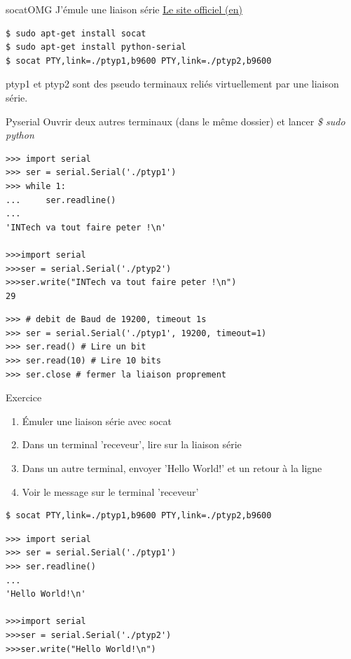 \documentclass{beamer}
\begin{document}
\begin{frame}[fragile]{socat}{OMG J'émule une liaison série}
\underline{\href{http://pyserial.sourceforge.net/}{Le site officiel (en)}}
\begin{lstlisting}[language=bash]
$ sudo apt-get install socat
$ sudo apt-get install python-serial
$ socat PTY,link=./ptyp1,b9600 PTY,link=./ptyp2,b9600
\end{lstlisting}
ptyp1 et ptyp2 sont des pseudo terminaux reliés virtuellement par une liaison série.\\
\end{frame}

\begin{frame}[fragile]{Pyserial}
Ouvrir deux autres terminaux (dans le même dossier) et lancer \textit{\$ sudo python}
\begin{lstlisting}[basicstyle=\tiny, multicols=2]
>>> import serial
>>> ser = serial.Serial('./ptyp1')
>>> while 1:
...     ser.readline()
...
'INTech va tout faire peter !\n'

>>>import serial
>>>ser = serial.Serial('./ptyp2')
>>>ser.write("INTech va tout faire peter !\n")
29
\end{lstlisting}
\begin{lstlisting}[basicstyle=\tiny]
>>> # debit de Baud de 19200, timeout 1s
>>> ser = serial.Serial('./ptyp1', 19200, timeout=1)
>>> ser.read() # Lire un bit
>>> ser.read(10) # Lire 10 bits
>>> ser.close # fermer la liaison proprement
\end{lstlisting}
\end{frame}

\begin{frame}[fragile]{Exercice}
\begin{enumerate}
 \item Émuler une liaison série avec socat
 \item Dans un terminal 'receveur', lire sur la liaison série
 \item Dans un autre terminal, envoyer 'Hello World!' et un retour à la ligne
 \item Voir le message sur le terminal 'receveur'
\end{enumerate}\pause

\begin{lstlisting}
$ socat PTY,link=./ptyp1,b9600 PTY,link=./ptyp2,b9600
\end{lstlisting}
\pause

\begin{lstlisting}[basicstyle=\tiny, multicols=2]
>>> import serial
>>> ser = serial.Serial('./ptyp1')
>>> ser.readline()
...
'Hello World!\n'

>>>import serial
>>>ser = serial.Serial('./ptyp2')
>>>ser.write("Hello World!\n")
\end{lstlisting}
\end{frame}
\end{document}
